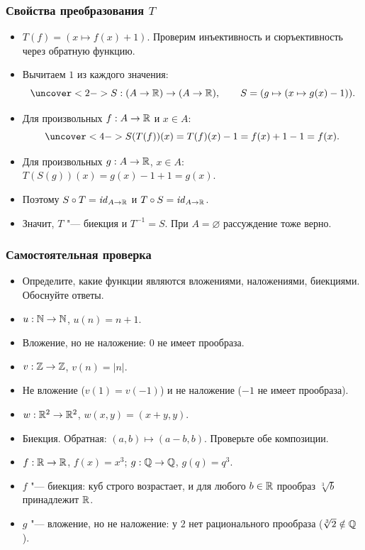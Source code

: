 \documentclass[10pt]{beamer}
\begin{document}
\begin{frame}
    \frametitle{Свойства преобразования $T$}
    \begin{itemize}
        \item $T(f)=(x\mapsto f(x)+1)$. Проверим инъективность и сюръективность через обратную функцию.
        \item<2-> Вычитаем $1$ из каждого значения:
        \[\uncover<2->{S:(A\to\R)\to(A\to\R),\qquad S=(g\mapsto(x\mapsto g(x)-1)).}\]
        \item<3-> Для произвольных $f:A\to\mathbb{R}$ и $x\in A$:
        \[\uncover<4->{S(T(f))(x)=T(f)(x)-1=f(x)+1-1=f(x).}\]
        \item<5-> Для произвольных $g:A\to\mathbb{R}$, $x\in A$: $T(S(g))(x)=g(x)-1+1=g(x)$.
        \item<6-> Поэтому $S\circ T=\mathit{id}_{A\to\mathbb{R}}$ и $T\circ S=\mathit{id}_{A\to\mathbb{R}}$.
        \item<7-> Значит, $T$ "--- биекция и $T^{-1}=S$. При $A=\varnothing$ рассуждение тоже верно.
    \end{itemize}
\end{frame}

\begin{frame}
    \frametitle{Самостоятельная проверка}
    \begin{itemize}
        \item Определите, какие функции являются вложениями, наложениями, биекциями. Обоснуйте ответы.
        \item $u:\mathbb{N}\to\mathbb{N}$, $u(n)=n+1$.
        \item<2-> Вложение, но не наложение: $0$ не имеет прообраза.
        \item<3-> $v:\mathbb{Z}\to\mathbb{Z}$, $v(n)=|n|$.
        \item<4-> Не вложение ($v(1)=v(-1)$) и не наложение ($-1$ не имеет прообраза).
        \item<5-> $w:\mathbb{R}^2\to\mathbb{R}^2$, $w(x,y)=(x+y,y)$.
        \item<6-> Биекция. Обратная: $(a,b)\mapsto(a-b,b)$. Проверьте обе композиции.
        \item<7-> $f:\mathbb{R}\to\mathbb{R}$, $f(x)=x^3$; $g:\mathbb{Q}\to\mathbb{Q}$, $g(q)=q^3$.
        \item<8-> $f$ "--- биекция: куб строго возрастает, и для любого $b\in\mathbb{R}$ прообраз $\sqrt[3]{b}$ принадлежит $\mathbb{R}$.
        \item<9-> $g$ "--- вложение, но не наложение: у $2$ нет рационального прообраза ($\sqrt[3]{2}\notin\mathbb{Q}$).
    \end{itemize}
\end{frame}
\end{document}
